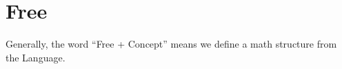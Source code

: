 \section{Free}

Generally, the word ``Free + Concept'' means we define a math structure from the Language.


